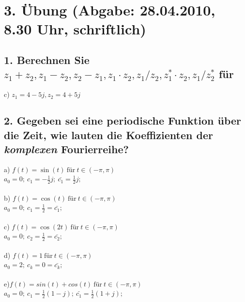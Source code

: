 \section*{3. \"Ubung (Abgabe: 28.04.2010, 8.30 Uhr, schriftlich)}

\subsection*{1. Berechnen Sie $z_{1}+z_{2}, z_{1}-z_{2}, z_{2}-z_{1}, z_{1}\cdot z_{2}, z_{1}/z_{2}, z_{1}^{*}\cdot z_{2}, z_{1}/z_{2}^{*}$ f\"ur}
c) $z_{1}=4-5j, z_{2}=4+5j$

\subsection*{2. Gegeben sei eine periodische Funktion \"uber die Zeit, wie lauten die Koeffizienten der \emph{komplexen} Fourierreihe?}
a) $f(t) = \sin(t)~\text{f\"ur}~t \in (-\pi, \pi)$\\
$a_0 = 0; ~ c_{1} = -\frac{1}{2}j; ~ \bar{c_{1}} = \frac{1}{2}j;$\\\\
b) $f(t) = \cos(t)~\text{f\"ur}~t \in (-\pi, \pi)$\\
$a_0 = 0; ~ c_{1} = \frac{1}{2} = \bar{c_{1}};$\\\\
c) $f(t) = \cos(2t)~\text{f\"ur}~t \in (-\pi, \pi)$\\
$a_0 = 0; ~ c_{2} = \frac{1}{2} = \bar{c_{2}};$\\\\
d) $f(t) = 1~\text{f\"ur}~t \in (-\pi, \pi)$\\
$a_0 = 2; ~ c_{k} = 0 = \bar{c_{k}};$\\\\
e)$f(t)=sin(t)+cos(t)~\text{f\"ur}~t \in (-\pi, \pi)$\\
$a_0 = 0; ~ c_{1} = \frac{1}{2}(1-j); ~ \bar{c_{1}} = \frac{1}{2}(1+j);$\\\\


